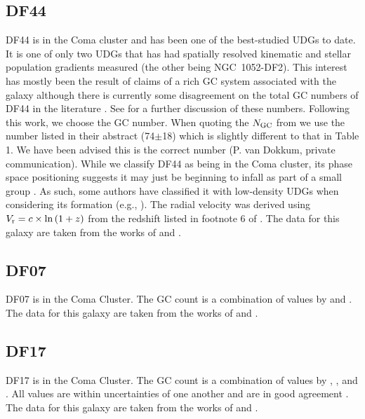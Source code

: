 \subsection{DF44}
DF44 is in the Coma cluster and has been one of the best-studied UDGs to date. It is one of only two UDGs that has had spatially resolved kinematic and stellar population gradients measured (the other being NGC~1052-DF2). This interest has mostly been the result of claims of a rich GC system associated with the galaxy \citet{vanDokkum2017} although there is currently some disagreement on the total GC numbers of DF44 in the literature \citep{Saifollahi2021, Saifollahi2022}. See \citet{Forbes2024} for a further discussion of these numbers. Following this work, we choose the \citet{vanDokkum2017} GC number. When quoting the $N_{\rm GC}$ from \citet{vanDokkum2017} we use the number listed in their abstract (74$\pm$18) which is slightly different to that in Table 1. We have been advised this is the correct number (P. van Dokkum, private communication). While we classify DF44 as being in the Coma cluster, its phase space positioning suggests it may just be beginning to infall as part of a small group \citep{vanDokkum2019b}. As such, some authors have classified it with low-density UDGs when considering its formation (e.g., \citealp{FerreMateu2023}).  The radial velocity was derived using $V_{\rm r} = c \times \ln{(1+z)}$ from the redshift listed in footnote 6 of \citet[$z=$0.02132]{vanDokkum2017}. The data for this galaxy are taken from the works of \citet{vanDokkum2016, vanDokkum2017, vanDokkum2019b, Gannon2021, Villaume2022, Webb2022} and \citet{Saifollahi2022}.

\subsection{DF07}
DF07 is in the Coma Cluster. The GC count is a combination of values by \citet[39.1$\pm$23.8]{Lim2018} and \citet[22$^{+5}_{-7}$]{Saifollahi2022}. The data for this galaxy are taken from the works of \citet{vanDokkum2015, Gu2018, Lim2018, Saifollahi2022} and \citet{FerreMateu2023}.

\subsection{DF17}
DF17 is in the Coma Cluster. The GC count is a combination of values by \citet[28$\pm$14]{Peng2016}, \citet[27$\pm$5]{Beasley2016b}, \citet[25$\pm$11]{vanDokkum2017} and \citet[26$^{+17}_{-7}$]{Saifollahi2022}. All values are within uncertainties of one another and are in good agreement \citep{Forbes2024}. The data for this galaxy are taken from the works of \citet{Peng2016, Beasley2016b, vanDokkum2017, Gu2018} and \citet{Saifollahi2022}.

